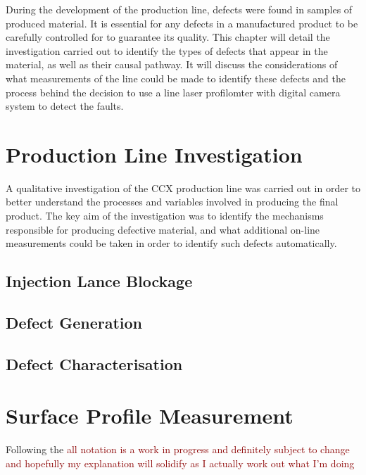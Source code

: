 \documentclass[12pt]{report}
\newcommand{\tcr}[1]{\textcolor{darkRed}{#1}}
\begin{document}
    During the development of the production line, defects were found in samples of produced material. It is essential for any defects in a manufactured product to be carefully controlled for to guarantee its quality. This chapter will detail the investigation carried out to identify the types of defects that appear in the material, as well as their causal pathway. It will discuss the considerations of what measurements of the line could be made to identify these defects and the process behind the decision to use a line laser profilomter with digital camera system to detect the faults.
    
    
           
\chapter{Production Line Investigation}
    A qualitative investigation of the CCX production line was carried out in order to better understand the processes and variables involved in producing the final product. The key aim of the investigation was to identify the mechanisms responsible for producing defective material, and what additional on-line measurements could be taken in order to identify such defects automatically.
    
    \section{Injection Lance Blockage}
        
    \section{Defect Generation}
        
    \section{Defect Characterisation}
    

\chapter{Surface Profile Measurement}
    Following the 
    \tcr{all notation is a work in progress and definitely subject to change and hopefully my explanation will solidify as I actually work out what I'm doing}
\end{document}
